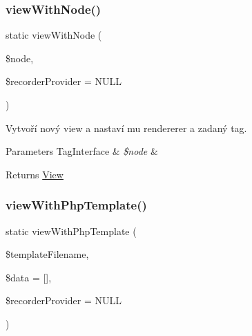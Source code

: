 \subsubsection{\texorpdfstring{view\+With\+Node()}{viewWithNode()}}
{\footnotesize\ttfamily static view\+With\+Node (\begin{DoxyParamCaption}\item[{\mbox{\hyperlink{interface_pes_1_1_dom_1_1_node_1_1_node_interface}{Node\+Interface}}}]{\$node,  }\item[{\mbox{\hyperlink{interface_pes_1_1_view_1_1_recorder_1_1_recorder_provider_interface}{Recorder\+Provider\+Interface}}}]{\$recorder\+Provider = {\ttfamily NULL} }\end{DoxyParamCaption})\hspace{0.3cm}{\ttfamily [static]}}

Vytvoří nový view a nastaví mu rendererer a zadaný tag. 
\begin{DoxyParams}[1]{Parameters}
Tag\+Interface & {\em \$node} & \\
\hline
\end{DoxyParams}
\begin{DoxyReturn}{Returns}
\mbox{\hyperlink{class_pes_1_1_view_1_1_view}{View}} 
\end{DoxyReturn}
\mbox{\label{class_pes_1_1_view_1_1_view_factory_a99c2532e2aa286f9b117deaec80acd0d}} 
\subsubsection{\texorpdfstring{view\+With\+Php\+Template()}{viewWithPhpTemplate()}}
{\footnotesize\ttfamily static view\+With\+Php\+Template (\begin{DoxyParamCaption}\item[{}]{\$template\+Filename,  }\item[{}]{\$data = {\ttfamily \mbox{[}\mbox{]}},  }\item[{\mbox{\hyperlink{interface_pes_1_1_view_1_1_recorder_1_1_recorder_provider_interface}{Recorder\+Provider\+Interface}}}]{\$recorder\+Provider = {\ttfamily NULL} }\end{DoxyParamCaption})\hspace{0.3cm}{\ttfamily [static]}}

